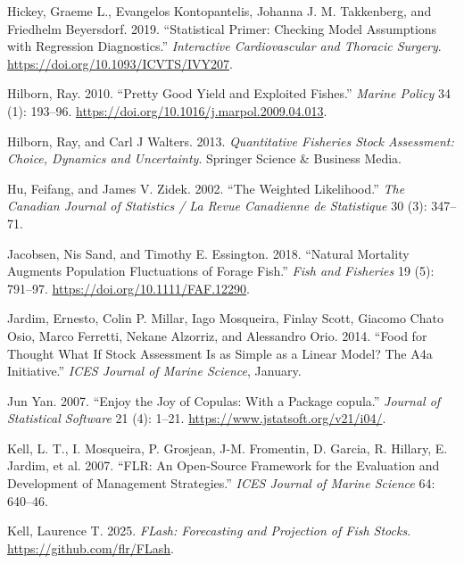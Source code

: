 \documentclass[
]{book}
\newlength{\cslhangindent}
\newlength{\cslentryspacingunit} %
\newenvironment{CSLReferences}[2] %
 {%
  \setlength{\parindent}{0pt}
  \ifodd #1
  \let\oldpar\par
  \def\par{\hangindent=\cslhangindent\oldpar}
  \fi
  \setlength{\parskip}{#2\cslentryspacingunit}
 }%
 {}
\begin{document}
\begin{CSLReferences}{1}{0}
\leavevmode{}%
Hickey, Graeme L., Evangelos Kontopantelis, Johanna J. M. Takkenberg, and Friedhelm Beyersdorf. 2019. {``Statistical Primer: Checking Model Assumptions with Regression Diagnostics.''} \emph{Interactive Cardiovascular and Thoracic Surgery}. \url{https://doi.org/10.1093/ICVTS/IVY207}.

\leavevmode{}%
Hilborn, Ray. 2010. {``Pretty Good Yield and Exploited Fishes.''} \emph{Marine Policy} 34 (1): 193--96. \url{https://doi.org/10.1016/j.marpol.2009.04.013}.

\leavevmode{}%
Hilborn, Ray, and Carl J Walters. 2013. \emph{Quantitative Fisheries Stock Assessment: Choice, Dynamics and Uncertainty}. Springer Science \& Business Media.

\leavevmode{}%
Hu, Feifang, and James V. Zidek. 2002. {``The Weighted Likelihood.''} \emph{The Canadian Journal of Statistics / La Revue Canadienne de Statistique} 30 (3): 347--71.

\leavevmode{}%
Jacobsen, Nis Sand, and Timothy E. Essington. 2018. {``Natural Mortality Augments Population Fluctuations of Forage Fish.''} \emph{Fish and Fisheries} 19 (5): 791--97. \url{https://doi.org/10.1111/FAF.12290}.

\leavevmode{}%
Jardim, Ernesto, Colin P. Millar, Iago Mosqueira, Finlay Scott, Giacomo Chato Osio, Marco Ferretti, Nekane Alzorriz, and Alessandro Orio. 2014. {``Food for Thought What If Stock Assessment Is as Simple as a Linear Model? The A4a Initiative.''} \emph{ICES Journal of Marine Science}, January.

\leavevmode{}%
Jun Yan. 2007. {``Enjoy the Joy of Copulas: With a Package {copula}.''} \emph{Journal of Statistical Software} 21 (4): 1--21. \url{https://www.jstatsoft.org/v21/i04/}.

\leavevmode{}%
Kell, L. T., I. Mosqueira, P. Grosjean, J-M. Fromentin, D. Garcia, R. Hillary, E. Jardim, et al. 2007. {``FLR: An Open-Source Framework for the Evaluation and Development of Management Strategies.''} \emph{ICES Journal of Marine Science} 64: 640--46.

\leavevmode{}%
Kell, Laurence T. 2025. \emph{FLash: Forecasting and Projection of Fish Stocks}. \url{https://github.com/flr/FLash}.


\end{CSLReferences}
\end{document}
